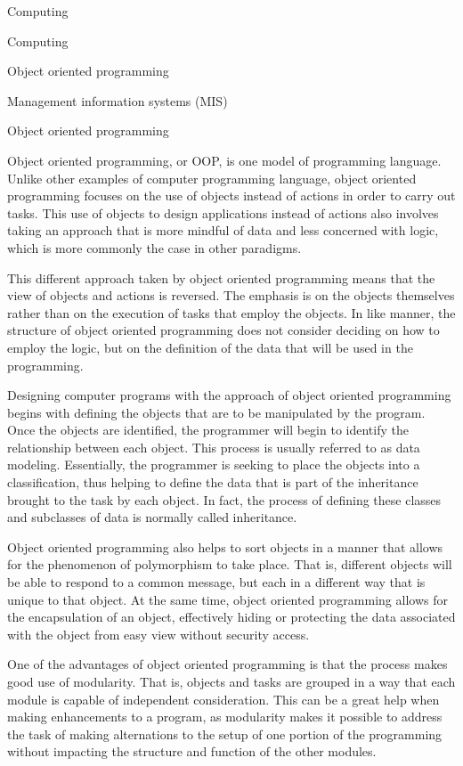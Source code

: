 
Computing


Computing

Object oriented programming

Management information systems (MIS)


Object oriented programming

Object oriented programming, or OOP, is one model of programming language. Unlike other examples of computer programming language, object oriented programming focuses on the use of objects instead of actions in order to carry out tasks. This use of objects to design applications instead of actions also involves taking an approach that is more mindful of data and less concerned with logic, which is more commonly the case in other paradigms.


This different approach taken by object oriented programming means that the view of objects and actions is reversed. The emphasis is on the objects themselves rather than on the execution of tasks that employ the objects. In like manner, the structure of object oriented programming does not consider deciding on how to employ the logic, but on the definition of the data that will be used in the programming.


Designing computer programs with the approach of object oriented programming begins with defining the objects that are to be manipulated by the program. Once the objects are identified, the programmer will begin to identify the relationship between each object. This process is usually referred to as data modeling. Essentially, the programmer is seeking to place the objects into a classification, thus helping to define the data that is part of the inheritance brought to the task by each object. In fact, the process of defining these classes and subclasses of data is normally called inheritance.


Object oriented programming also helps to sort objects in a manner that allows for the phenomenon of polymorphism to take place. That is, different objects will be able to respond to a common message, but each in a different way that is unique to that object. At the same time, object oriented programming allows for the encapsulation of an object, effectively hiding or protecting the data associated with the object from easy view without security access.


One of the advantages of object oriented programming is that the process makes good use of modularity. That is, objects and tasks are grouped in a way that each module is capable of independent consideration. This can be a great help when making enhancements to a program, as modularity makes it possible to address the task of making alternations to the setup of one portion of the programming without impacting the structure and function of the other modules.

